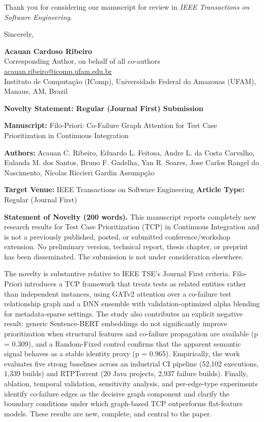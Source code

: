 \documentclass[11pt]{article}
\begin{document}
Thank you for considering our manuscript for review in \textit{IEEE
Transactions on Software Engineering}.

\medskip
\noindent Sincerely,

\noindent\textbf{Acauan Cardoso Ribeiro}\\
Corresponding Author, on behalf of all co-authors\\
\href{mailto:acauan.ribeiro@icomp.ufam.edu.br}{acauan.ribeiro@icomp.ufam.edu.br}\\
Instituto de Computação (IComp), Universidade Federal do Amazonas (UFAM),
Manaus, AM, Brazil

\newpage

\noindent\textbf{\large Novelty Statement: Regular (Journal First) Submission}

\medskip
\noindent\textbf{Manuscript:} Filo-Priori: Co-Failure Graph Attention for Test
Case Prioritization in Continuous Integration

\noindent\textbf{Authors:} Acauan C. Ribeiro, Eduardo L. Feitosa, Andre L. da
Costa Carvalho, Eulanda M. dos Santos, Bruno F. Gadelha, Yan R. Soares, Jose
Carlos Rangel do Nascimento, Nícolas Riccieri Gardin Assumpção

\noindent\textbf{Target Venue:} IEEE Transactions on Software Engineering
\quad\textbf{Article Type:} Regular (Journal First)

\hrulefill

\medskip
\noindent\textbf{Statement of Novelty (200 words).}
This manuscript reports completely new research results for Test Case
Prioritization (TCP) in Continuous Integration and is not a previously
published, posted, or submitted conference/workshop extension. No preliminary
version, technical report, thesis chapter, or preprint has been disseminated.
The submission is not under consideration elsewhere.

The novelty is substantive relative to IEEE TSE's Journal First criteria.
Filo-Priori introduces a TCP framework that treats tests as related entities
rather than independent instances, using GATv2 attention over a co-failure test
relationship graph and a DNN ensemble with validation-optimized alpha blending
for metadata-sparse settings. The study also contributes an explicit negative
result: generic Sentence-BERT embeddings do not significantly improve
prioritization when structural features and co-failure propagation are
available (p = 0.309), and a Random-Fixed control confirms that the apparent
semantic signal behaves as a stable identity proxy (p = 0.965). Empirically,
the work evaluates five strong baselines across an industrial CI pipeline
(52,102 executions, 1,339 builds) and RTPTorrent (20 Java projects, 2,937
failure builds). Finally, ablation, temporal validation, sensitivity analysis,
and per-edge-type experiments identify co-failure edges as the decisive graph
component and clarify the boundary conditions under which graph-based TCP
outperforms flat-feature models. These results are new, complete, and central
to the paper.
\end{document}
